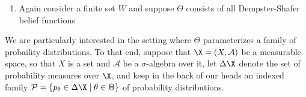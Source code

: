\begin{phaseout}
\begin{enumerate}



\item
Again consider a finite set $W$ and suppose $\Theta$ consists of all Dempster-Shafer belief functions
\end{enumerate}



%



We are particularly interested in the setting where $\Theta$ parameterizes a family of probaility distributions.
To that end, suppose that $\X = (X, \mathcal A)$ be a measurable space, so that $X$ is a set and $\mathcal A$ be a $\sigma$-algebra over it, let $\Delta \X$ denote the set of probability measures over $\X$,
and keep in the back of our heads an indexed family
$
	\mathcal P =
	\{ p_\theta \in\Delta\X \mid \theta \in \Theta \}
$ of probability distributions.
\end{phaseout}

%
